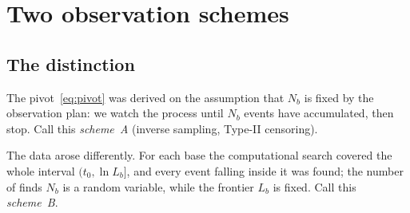 \documentclass[11pt,a4paper]{article}
\theoremstyle{plain}
\theoremstyle{remark}
\begin{document}
\section{Two observation schemes}\label{sec:scheme}

\subsection{The distinction}

The pivot~\eqref{eq:pivot} was derived on the assumption that $N_b$ is fixed by
the observation plan: we watch the process until $N_b$ events have accumulated,
then stop. Call this \emph{scheme~A} (inverse sampling, Type-II censoring).

The data arose differently. For each base the computational search covered the
whole interval $(t_0,\ln L_b]$, and every event falling inside it was found; the
number of finds $N_b$ is a random variable, while the frontier $L_b$ is fixed.
Call this \emph{scheme~B}.
\end{document}
